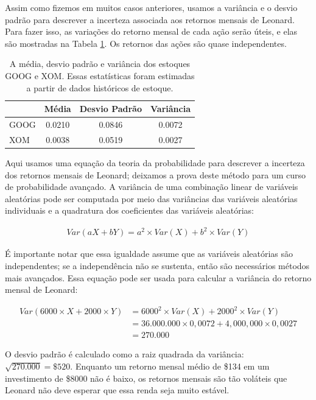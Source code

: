 \documentclass[
]{book}
\theoremstyle{definition}
\theoremstyle{definition}
\theoremstyle{definition}
\theoremstyle{definition}
\theoremstyle{remark}
\begin{document}
Assim como fizemos em muitos casos anteriores, usamos a variância e o desvio padrão para descrever a incerteza associada aos retornos mensais de Leonard. Para fazer isso, as variações do retorno mensal de cada ação serão úteis, e elas são mostradas na Tabela \ref{tab:sumStatOfGOOGXOM}. Os retornos das ações são quase independentes.

\begin{table}

\caption{\label{tab:sumStatOfGOOGXOM}A média, desvio padrão e variância dos estoques GOOG e XOM. Essas estatísticas foram estimadas a partir de dados históricos de estoque.}
\centering
\begin{tabular}[t]{l|c|c|c}
\hline
  & Média & Desvio Padrão & Variância\\
\hline
GOOG & 0.0210 & 0.0846 & 0.0072\\
\hline
XOM & 0.0038 & 0.0519 & 0.0027\\
\hline
\end{tabular}
\end{table}

Aqui usamos uma equação da teoria da probabilidade para descrever a incerteza dos retornos mensais de Leonard; deixamos a prova deste método para um curso de probabilidade avançado. A variância de uma combinação linear de variáveis aleatórias pode ser computada por meio das variâncias das variáveis aleatórias individuais e a quadratura dos coeficientes das variáveis aleatórias:

\begin{align*}
Var(aX + bY) = a^2\times Var(X) + b^2\times Var(Y)
\end{align*}

É importante notar que essa igualdade assume que as variáveis aleatórias são independentes; se a independência não se sustenta, então são necessários métodos mais avançados. Essa equação pode ser usada para calcular a variância do retorno mensal de Leonard:

\begin{align*}
Var(6000\times X + 2000\times Y)
    &= 6000^2\times Var(X) + 2000^2\times Var(Y) \\
    &= 36.000.000\times 0,0072 + 4,000,000\times 0,0027 \\
    &= 270.000
\end{align*}

O desvio padrão é calculado como a raiz quadrada da variância: \(\sqrt{270.000} = \$520\). Enquanto um retorno mensal médio de \$134 em um investimento de \$8000 não é baixo, os retornos mensais são tão voláteis que Leonard não deve esperar que essa renda seja muito estável.
\end{document}
